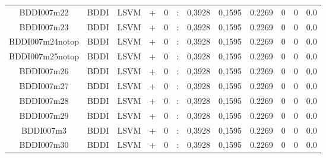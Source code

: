 \documentclass[a4paper]{article}
\begin{document}
\begin{landscape}
\begin{center}
\begin{tabular}{ |c|c|c|c|c|c|c|c|c|c|c|c|}
 	
 
 	
 		
 		\small{ BDDI007m22 } & BDDI & LSVM & +  &  0 &  :  &  0,3928 & 0,1595 & 0.2269  &  0 & 0 & 0.0 \\
 		

 	
 
 	
 		
 		\small{ BDDI007m23 } & BDDI & LSVM & +  &  0 &  :  &  0,3928 & 0,1595 & 0.2269  &  0 & 0 & 0.0 \\
 		

 	
 
 	
 		
 		\small{ BDDI007m24notop } & BDDI & LSVM & +  &  0 &  :  &  0,3928 & 0,1595 & 0.2269  &  0 & 0 & 0.0 \\
 		

 	
 
 	
 		
 		\small{ BDDI007m25notop } & BDDI & LSVM & +  &  0 &  :  &  0,3928 & 0,1595 & 0.2269  &  0 & 0 & 0.0 \\
 		

 	
 
 	
 		
 		\small{ BDDI007m26 } & BDDI & LSVM & +  &  0 &  :  &  0,3928 & 0,1595 & 0.2269  &  0 & 0 & 0.0 \\
 		

 	
 
 	
 		
 		\small{ BDDI007m27 } & BDDI & LSVM & +  &  0 &  :  &  0,3928 & 0,1595 & 0.2269  &  0 & 0 & 0.0 \\
 		

 	
 
 	
 		
 		\small{ BDDI007m28 } & BDDI & LSVM & +  &  0 &  :  &  0,3928 & 0,1595 & 0.2269  &  0 & 0 & 0.0 \\
 		

 	
 
 	
 		
 		\small{ BDDI007m29 } & BDDI & LSVM & +  &  0 &  :  &  0,3928 & 0,1595 & 0.2269  &  0 & 0 & 0.0 \\
 		

 	
 
 	
 		
 		\small{ BDDI007m3 } & BDDI & LSVM & +  &  0 &  :  &  0,3928 & 0,1595 & 0.2269  &  0 & 0 & 0.0 \\
 		

 	
 
 	
 		
 		\small{ BDDI007m30 } & BDDI & LSVM & +  &  0 &  :  &  0,3928 & 0,1595 & 0.2269  &  0 & 0 & 0.0 \\
 		


\end{tabular}
\end{center}
\end{landscape}
\end{document}
